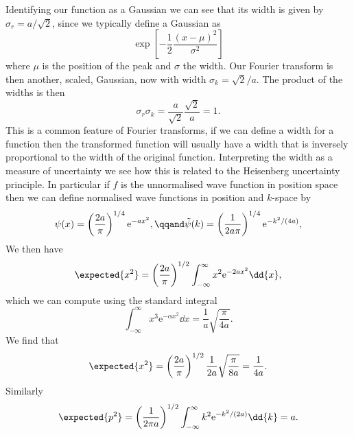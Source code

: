 \documentclass[fleqn]{NotesClass}
\newcommand*{\e}{\mathrm{e}}
\begin{document}
    Identifying our function as a Gaussian we can see that its width is given by \(\sigma_r = a/\sqrt{2}\), since we typically define a Gaussian as
    \begin{equation}
        \exp\left[ -\frac{1}{2}\frac{(x - \mu)^2}{\sigma^2} \right]
    \end{equation}
    where \(\mu\) is the position of the peak and \(\sigma\) the width.
    Our Fourier transform is then another, scaled, Gaussian, now with width \(\sigma_k = \sqrt{2}/a\).
    The product of the widths is then
    \begin{equation}
        \sigma_r\sigma_k = \frac{a}{\sqrt{2}} \frac{\sqrt{2}}{a} = 1.
    \end{equation}
    This is a common feature of Fourier transforms, if we can define a width for a function then the transformed function will usually have a width that is inversely proportional to the width of the original function.
    Interpreting the width as a measure of uncertainty we see how this is related to the Heisenberg uncertainty principle.
    In particular if \(f\) is the unnormalised wave function in position space then we can define normalised wave functions in position and \(k\)-space by
    \begin{equation}
        \psi(x) = \left( \frac{2a}{\pi} \right)^{1/4}\e^{-ax^2}, \qqand \tilde{\psi}(k) = \left( \frac{1}{2a\pi} \right)^{1/4} \e^{-k^2/(4a)},
    \end{equation}
    We then have
    \begin{equation}
        \expected{x^2} = \left( \frac{2a}{\pi} \right)^{1/2} \int_{-\infty}^{\infty} x^2\e^{-2ax^2} \dd{x},
    \end{equation}
    which we can compute using the standard integral
    \begin{equation}
        \int_{-\infty}^{\infty} x^3\e^{-\alpha x^2} \dd{x} = \frac{1}{a}\sqrt{\frac{\pi}{4a}}.
    \end{equation}
    We find that
    \begin{equation}
        \expected{x^2} = \left( \frac{2a}{\pi} \right)^{1/2} \frac{1}{2a} \sqrt{\frac{\pi}{8a}} = \frac{1}{4a}.
    \end{equation}
    Similarly
    \begin{equation}
        \expected{p^2} = \left( \frac{1}{2\pi a} \right)^{1/2} \int_{-\infty}^{\infty} k^2\e^{-k^2/(2a)} \dd{k} = a.
    \end{equation}
    
\end{document}
